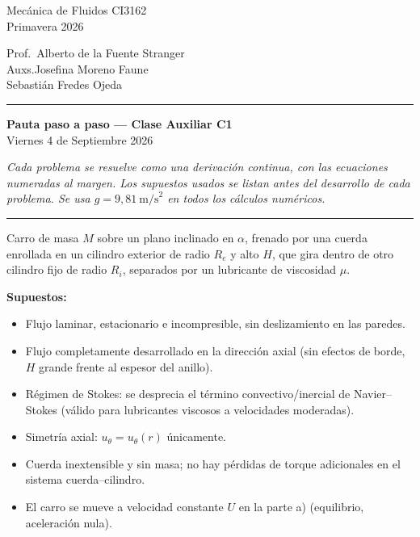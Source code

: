 \documentclass[11pt]{article}
\newenvironment{supuestos}{%
  \noindent\textbf{Supuestos:}
  \begin{itemize}[leftmargin=1.4em, itemsep=1pt]
}{%
  \end{itemize}
}
\begin{document}
\shorthandoff{<>}

\noindent
\begin{minipage}[t]{0.45\textwidth}
\raggedright
Mec\'anica de Fluidos CI3162\\
Primavera 2026
\end{minipage}%
\hfill
\begin{minipage}[t]{0.45\textwidth}
\raggedleft
Prof.\ Alberto de la Fuente Stranger\\
Auxs.\hspace{0.6cm}Josefina Moreno Faune\\
Sebasti\'an Fredes Ojeda
\end{minipage}

\vspace{3pt}
\hrule
\vspace{-5pt}

\begin{center}
{\Huge\bfseries Pauta paso a paso --- Clase Auxiliar C1}\\[6pt]
Viernes 4 de Septiembre 2026
\end{center}

\vspace{10pt}
\noindent\textit{Cada problema se resuelve como una derivaci\'on continua, con las
ecuaciones numeradas al margen. Los supuestos usados se listan antes del desarrollo de
cada problema. Se usa $g=9{,}81\ \text{m/s}^2$ en todos los c\'alculos num\'ericos.}
\vspace{4pt}
\hrule

\newpage
{}

\noindent Carro de masa $M$ sobre un plano inclinado en $\alpha$, frenado por una
cuerda enrollada en un cilindro exterior de radio $R_e$ y alto $H$, que gira dentro de
otro cilindro fijo de radio $R_i$, separados por un lubricante de viscosidad $\mu$.

\begin{supuestos}
\item Flujo laminar, estacionario e incompresible, sin deslizamiento en las paredes.
\item Flujo completamente desarrollado en la direcci\'on axial (sin efectos de borde,
$H$ grande frente al espesor del anillo).
\item R\'egimen de Stokes: se desprecia el t\'ermino convectivo/inercial de
Navier--Stokes (v\'alido para lubricantes viscosos a velocidades moderadas).
\item Simetr\'ia axial: $u_\theta=u_\theta(r)$ \'unicamente.
\item Cuerda inextensible y sin masa; no hay p\'erdidas de torque adicionales en el
sistema cuerda--cilindro.
\item El carro se mueve a velocidad constante $U$ en la parte a) (equilibrio,
aceleraci\'on nula).
\end{supuestos}
\end{document}
